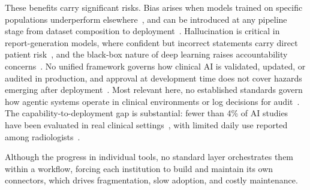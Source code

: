 \documentclass[1p,12pt]{elsarticle}
\begin{document}
These benefits carry significant risks. Bias arises when models trained on specific populations underperform elsewhere~\cite{mittermaier2023bias}, and can be introduced at any pipeline stage from dataset composition to deployment~\cite{kocak2025bias}. Hallucination is critical in report-generation models, where confident but incorrect statements carry direct patient risk~\cite{griot2025metacognition}, and the black-box nature of deep learning raises accountability concerns~\cite{kondylakis2026futureai}. No unified framework governs how clinical AI is validated, updated, or audited in production, and approval at development time does not cover hazards emerging after deployment~\cite{jia2025deployment}. Most relevant here, no established standards govern how agentic systems operate in clinical environments or log decisions for audit~\cite{trustworthyai2025}. The capability-to-deployment gap is substantial: fewer than 4\% of AI studies have been evaluated in real clinical settings~\cite{cozzolino2025surveillance}, with limited daily use reported among radiologists~\cite{kondylakis2026futureai, ce2024perceptions}.

Although the progress in individual tools, no standard layer orchestrates them within a workflow, forcing each institution to build and maintain its own connectors, which drives fragmentation, slow adoption, and costly maintenance. %
\end{document}
